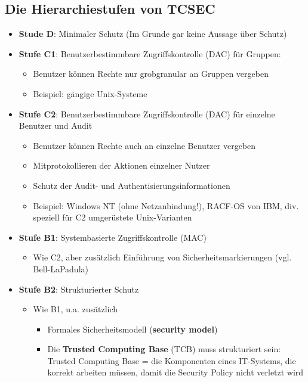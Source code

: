\documentclass[openany]{book}
\begin{document}
\subsection{Die Hierarchiestufen von TCSEC}

\begin{itemize}
    \item \textbf{Stude D}: Minimaler Schutz (Im Grunde gar keine Aussage über Schutz)
    \item \textbf{Stufe C1}: Benutzerbestimmbare Zugriffskontrolle (DAC) für Gruppen:
    \begin{itemize}
        \item Benutzer können Rechte nur grobgranular an Gruppen vergeben
        \item Beispiel: gängige Unix-Systeme
    \end{itemize}
    \item \textbf{Stufe C2}: Benutzerbestimmbare Zugriffskontrolle (DAC) für einzelne Benutzer und Audit
    \begin{itemize}
        \item Benutzer können Rechte auch an einzelne Benutzer vergeben
        \item Mitprotokollieren der Aktionen einzelner Nutzer
        \item Schutz der Audit- und Authentisierungsinformationen
        \item Beispiel: Windows NT (ohne Netzanbindung!), RACF-OS von IBM, div. speziell für C2 umgerüstete Unix-Varianten
    \end{itemize}
    \item \textbf{Stufe B1}: Systembasierte Zugriffskontrolle (MAC)
    \begin{itemize}
        \item Wie C2, aber zusätzlich Einführung von Sicherheitsmarkierungen (vgl. Bell-LaPadula)
    \end{itemize}
    \item \textbf{Stufe B2}: Strukturierter Schutz
    \begin{itemize}
        \item Wie B1, u.a. zusätzlich
        \begin{itemize}
            \item Formales Sicherheitsmodell (\textbf{security model})
            \item Die \textbf{Trusted Computing Base} (TCB) muss strukturiert sein: Trusted Computing Base = die Komponenten eines IT-Systems, die korrekt arbeiten müssen, damit die Security Policy nicht verletzt wird

\end{itemize}
\end{itemize}
\end{itemize}
\end{document}
